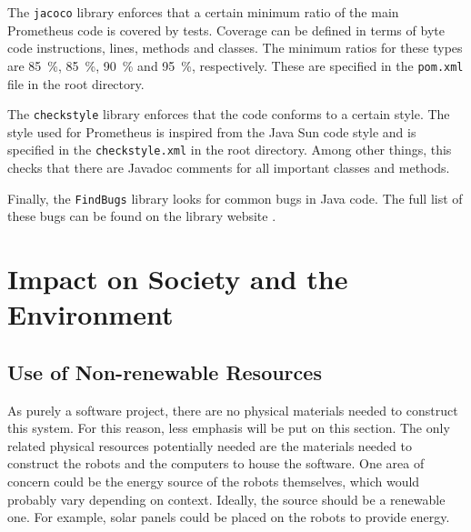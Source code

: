 \documentclass[titlepage,11pt]{article}
\newcommand{\code}[1]{\texttt{#1}}
\begin{document}
The \code{jacoco} library enforces that a certain minimum ratio of the main Prometheus code is covered by tests. Coverage can be defined in terms of byte code instructions, lines, methods and classes. The minimum ratios for these types are \SI{85}{\percent}, \SI{85}{\percent}, \SI{90}{\percent} and \SI{95}{\percent}, respectively. These are specified in the \code{pom.xml} file in the root directory.

The \code{checkstyle} library enforces that the code conforms to a certain style. The style used for Prometheus is inspired from the Java Sun code style \cite{sun_style} and is specified in the \code{checkstyle.xml} in the root directory. Among other things, this checks that there are Javadoc comments for all important classes and methods.

Finally, the \code{FindBugs} library looks for common bugs in Java code. The full list of these bugs can be found on the library website \cite{findbugs}.

\section{Impact on Society and the Environment}
\label{sec:impact}


\subsection{Use of Non-renewable Resources}

As purely a software project, there are no physical materials needed to construct this system. For this reason, less emphasis will be put on this section. The only related physical resources potentially needed are the materials needed to construct the robots and the computers to house the software. One area of concern could be the energy source of the robots themselves, which would probably vary depending on context. Ideally, the source should be a renewable one. For example, solar panels could be placed on the robots to provide energy.
\end{document}

